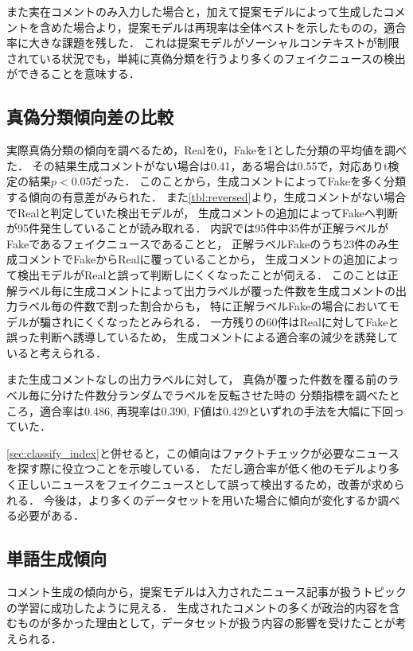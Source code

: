 また実在コメントのみ入力した場合と，加えて提案モデルによって生成したコメントを含めた場合より，提案モデルは再現率は全体ベストを示したものの，適合率に大きな課題を残した．
これは提案モデルがソーシャルコンテキストが制限されている状況でも，単純に真偽分類を行うより多くのフェイクニュースの検出ができることを意味する．

\subsection{真偽分類傾向差の比較}
\label{sec:classify_trend}
実際真偽分類の傾向を調べるため，Realを0，Fakeを1とした分類の平均値を調べた．
その結果生成コメントがない場合は0.41，ある場合は0.55で，対応ありt検定の結果$p<0.05$だった．
このことから，生成コメントによってFakeを多く分類する傾向の有意差がみられた．
また\cref{tbl:reversed}より，生成コメントがない場合でRealと判定していた検出モデルが，
生成コメントの追加によってFakeへ判断が95件発生していることが読み取れる．
内訳では95件中35件が正解ラベルがFakeであるフェイクニュースであることと，
正解ラベルFakeのうち23件のみ生成コメントでFakeからRealに覆っていることから，
生成コメントの追加によって検出モデルがRealと誤って判断しにくくなったことが伺える．
このことは正解ラベル毎に生成コメントによって出力ラベルが覆った件数を生成コメントの出力ラベル毎の件数で割った割合からも，
特に正解ラベルFakeの場合においてモデルが騙されにくくなったとみられる．
一方残りの60件はRealに対してFakeと誤った判断へ誘導しているため，
生成コメントによる適合率の減少を誘発していると考えられる．


また生成コメントなしの出力ラベルに対して，
真偽が覆った件数を覆る前のラベル毎に分けた件数分ランダムでラベルを反転させた時の
分類指標を調べたところ，適合率は0.486, 再現率は0.390, F値は0.429といずれの手法を大幅に下回っていた．

\cref{sec:classify_index}と併せると，この傾向はファクトチェックが必要なニュースを探す際に役立つことを示唆している．
ただし適合率が低く他のモデルより多く正しいニュースをフェイクニュースとして誤って検出するため，改善が求められる．
今後は，より多くのデータセットを用いた場合に傾向が変化するか調べる必要がある．

\subsection{単語生成傾向}
コメント生成の傾向から，提案モデルは入力されたニュース記事が扱うトピックの学習に成功したように見える．
生成されたコメントの多くが政治的内容を含むものが多かった理由として，データセットが扱う内容の影響を受けたことが考えられる．

